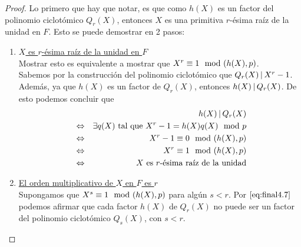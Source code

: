 	\begin{proof}
		Lo primero que hay que notar, es que como $h(X)$ es un factor del polinomio ciclotómico $Q_r(X)$, entonces $X$ es una primitiva $r$-ésima raí­z de la unidad en $F$. Esto se puede demostrar en 2 pasos:
		\begin{enumerate}
			\item \underline{$X$ es $r$-ésima raí­z de la unidad en $F$}\\
			Mostrar esto es equivalente a mostrar que $X^r\equiv 1\mod (h(X),p)$.\\
			Sabemos por la construcción del polinomio ciclotómico que $Q_r(X)\hspace{1.8pt}|\hspace{1.8pt}  X^r-1$. Además, ya que $h(X)$ es un factor de $Q_r(X)$, entonces $h(X)\hspace{1.8pt}|\hspace{1.8pt}  Q_r(X)$. De esto podemos concluir que 
			\begin{eqnarray}
				& &h(X)\divi  Q_r(X)\nonumber\\
				&\Leftrightarrow &\exists q(X) \text{ tal que }X^r-1 = h(X)q(X)\modl p\nonumber\\
				&\Leftrightarrow &X^r -1 \equiv 0 \modulohp\nonumber\\
				&\Leftrightarrow &X^r  \equiv 1 \modulohp\nonumber\\
				&\Leftrightarrow &X \text{ es }r\text{-ésima raí­z de la unidad}\nonumber
			\end{eqnarray}	
			\item \underline{El orden multiplicativo de $X$ en $F$ es $r$}\\
			Supongamos que $X^s\equiv 1 \mod (h(X),p)$ para algún $s<r$.
			Por $\eqref{eq:final4.7}$ podemos afirmar que cada factor $h(X)$ de $Q_r(X)$ no puede ser un factor del polinomio ciclotómico $Q_s(X)$, con $s<r$.
			

\end{enumerate}
\end{proof}
